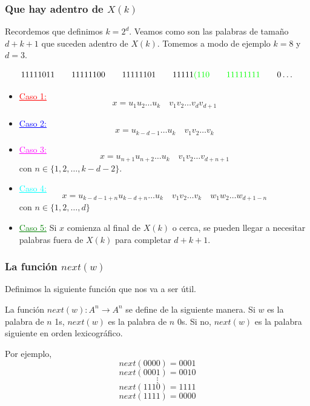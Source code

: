\documentclass[10pt,mathserif]{beamer}%
\begin{document}
\begin{frame}
  \frametitle{Que hay adentro de $X(k)$}
  Recordemos que definimos $k = 2^d$.
  Veamos como son las palabras de tamaño $d + k + 1$ que suceden adentro de $X(k)$. Tomemos a modo de ejemplo $k = 8$ y $d = 3$.

  $$11111011 \qquad 11111100 \qquad 11111101 \qquad 11111\textcolor{green}{(110 \qquad 11111111} \qquad 0\dots $$

    \begin{itemize}
    \item \textcolor{red}{\underline{Caso 1:}}
    $$x = u_1 u_2 \dots u_k \quad v_1 v_2 \dots v_{d} v_{d + 1}$$
    \item \textcolor{blue}{\underline{Caso 2:}}
    $$ x = u_{k-d-1} \dots u_k \quad v_1 v_2 \dots v_k$$
    \item \textcolor{magenta}{\underline{Caso 3:}}
    $$x = u_{n+1} u_{n+2} \dots u_k \quad  v_1 v_2 \dots v_{d+n+1} $$
    con $n \in \{1,2,\dots ,k - d - 2\}$.
    \item \textcolor{cyan}{\underline{Caso 4:}}
    $$ x = u_{k-d-1+n} u_{k-d+n} \dots u_k \quad v_1 v_2 \dots v_k \quad w_1 w_2 \dots w_{d+1-n}$$
    con $n \in \{1, 2, \dots , d\}$
    \item \textcolor{green}{\underline{Caso 5:}}
    Si $x$ comienza al final de $X(k)$ o cerca, se pueden llegar a necesitar palabras fuera de $X(k)$ para completar $d+k+1$.
  \end{itemize}
\end{frame} 

\begin{frame}
  \frametitle{La función $next(w)$}

  Definimos la siguiente función que nos va a ser útil.

  \begin{definition}
    La función $next(w) : A^n \rightarrow A^n$ se define de la siguiente manera. Si $w$ es la palabra de $n$  1s, $next(w)$ es la palabra de $n$ 0s. Si no, $next(w)$ es la palabra siguiente en orden lexicográfico.
  \end{definition}
  
  Por ejemplo,
  $$next(0000) = 0001$$
  $$next(0001) = 0010$$
  $$\vdots$$
  $$next(1110) = 1111$$
  $$next(1111) = 0000$$

\end{frame} 
\end{document}
